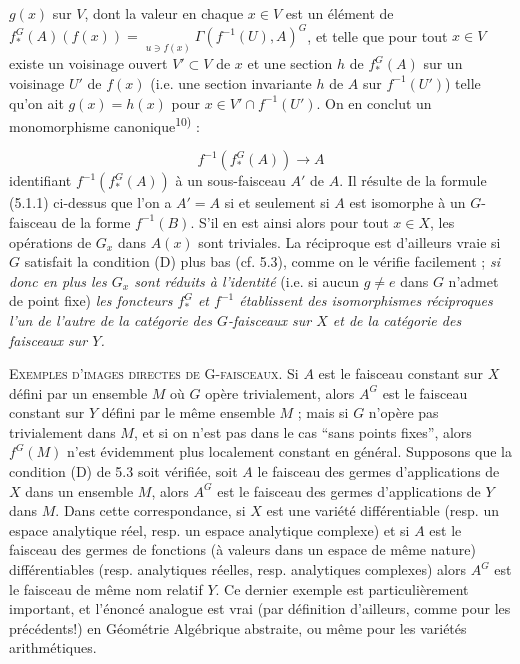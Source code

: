 \clearpage
{}

$g(x)$ sur $V$, dont la valeur en chaque $x\in V$ est un élément de $f_*^G(A)(f(x))=\mathop{\underset{\to}{\mathrm{lim.}}}\limits_{u\ni f(x)}\Gamma(f^{-1}(U),A)^G$,
et telle que pour tout $x\in V$ existe un voisinage ouvert $V'\subset V$ de
$x$ et une section $h$ de $f_*^G(A)$ sur un voisinage $U'$ de $f(x)$ (i.e.
une section invariante $h$ de $A$ sur $f^{-1}(U')$) telle qu'on ait
$g(x)=h(x)$ pour $x\in V'\cap f^{-1}(U')$. On en conclut un monomorphisme
canonique\textsuperscript{10)} :

\[
f^{-1}(f_*^G(A))\to A
\tag{5.1.2}
\]
identifiant $f^{-1}(f_*^G(A))$ à un sous-faisceau $A'$ de $A$. Il résulte de
la formule (5.1.1) ci-dessus que l'on a $A'=A$ si et seulement si $A$ est
isomorphe à un $G$-faisceau de la forme $f^{-1}(B)$. S'il en est ainsi alors
pour tout $x\in X$, les opérations de $G_x$ dans $A(x)$ sont triviales. La
réciproque est d'ailleurs vraie si $G$ satisfait la condition (D) plus bas
(cf. 5.3), comme on le vérifie facilement ;
\textit{si donc en plus les $G_x$ sont réduits à l'identité} (i.e. si aucun
$g\ne e$ dans $G$ n'admet de point fixe) \textit{les foncteurs $f_*^G$ et
$f^{-1}$ établissent des isomorphismes réciproques l'un de l'autre de la
catégorie des $G$-faisceaux sur $X$ et de la catégorie des faisceaux sur $Y$.}

\textsc{Exemples d'images directes de G-faisceaux.} Si $A$ est le
faisceau constant sur $X$ défini par un ensemble $M$ où $G$ opère
trivialement, alors $A^G$ est le faisceau constant sur $Y$ défini par le même
ensemble $M$ ; mais si $G$ n'opère pas trivialement dans $M$, et si on n'est
pas dans le cas ``sans points fixes'', alors $f^G(M)$ n'est évidemment plus
localement constant en général.
Supposons que la condition (D) de 5.3 soit vérifiée, soit $A$ le faisceau des
germes d'applications de $X$ dans un ensemble $M$, alors $A^G$ est le faisceau
des germes d'applications de $Y$ dans $M$. Dans cette correspondance, si $X$
est une variété différentiable (resp. un espace analytique réel, resp. un
espace analytique complexe) et si $A$ est le faisceau des germes de fonctions
(à valeurs dans un espace de même nature) différentiables (resp. analytiques
réelles, resp. analytiques complexes) alors $A^G$ est le faisceau de même nom
relatif $Y$. Ce dernier exemple est particulièrement important, et l'énoncé
analogue est vrai (par définition d'ailleurs, comme pour les précédents!) en
Géométrie Algébrique abstraite, ou même pour les variétés arithmétiques.

